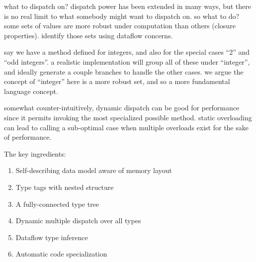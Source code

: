 what to dispatch on? dispatch power has been extended in many ways, but
there is no real limit to what somebody might want to dispatch on.
so what to do?
some sets of values are more robust under computation than others
(closure properties).
identify those sets using dataflow concerns.

say we have a method defined for integers, and also for the special cases
``2'' and ``odd integers''. a realistic implementation
will group all of these under ``integer'', and ideally generate a couple
branches to handle the other cases. we argue the concept of ``integer''
here is a more robust set, and so a more fundamental language concept.


somewhat counter-intuitively, dynamic dispatch can be good for performance
since it permits invoking the most specialized possible method.
static overloading can lead to calling a sub-optimal case when multiple
overloads exist for the sake of performance.









The key ingredients:

\begin{singlespace}
\begin{enumerate}
\item Self-describing data model aware of memory layout
\item Type tags with nested structure
\item A fully-connected type tree
\item Dynamic multiple dispatch over all types %
\item Dataflow type inference
\item Automatic code specialization
\end{enumerate}
\end{singlespace}

